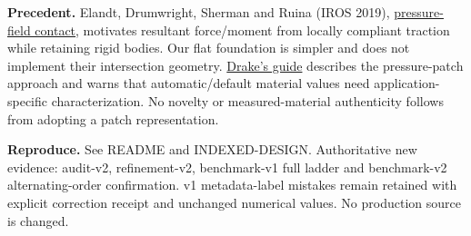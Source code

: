 \documentclass[10pt,a4paper]{article}
\begin{document}
\textbf{Precedent.} Elandt, Drumwright, Sherman and Ruina (IROS 2019),
\href{https://arxiv.org/abs/1904.11433}{pressure-field contact}, motivates resultant
force/moment from locally compliant traction while retaining rigid bodies. Our
flat foundation is simpler and does not implement their intersection geometry.
\href{https://drake.mit.edu/doxygen_cxx/group__hydroelastic__user__guide.html}{Drake's guide}
describes the pressure-patch approach and warns that automatic/default material
values need application-specific characterization. No novelty or measured-material
authenticity follows from adopting a patch representation.

\textbf{Reproduce.} See README and INDEXED-DESIGN. Authoritative new evidence:
audit-v2, refinement-v2, benchmark-v1 full ladder and benchmark-v2 alternating-order
confirmation. v1 metadata-label mistakes remain retained with explicit correction
receipt and unchanged numerical values. No production source is changed.
\end{document}
